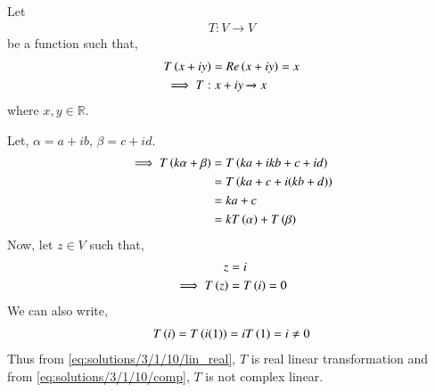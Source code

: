 Let
\begin{align}
    T : V \xrightarrow{} V
\end{align}
be a function such that, 
\begin{align}
    &T\left(x+iy\right) = Re\left(x+iy\right) = x  \\
    &\implies T : x+iy \xrightarrow{} x
\end{align}
 where $ x,y \in \mathbb{R}$.
 
Let, $ \alpha = a+ib$, $\beta = c+id$. 
\begin{align}
    \implies T\left(k\alpha+\beta\right) &= T\left(ka+ikb+c+id\right) \\
    &= T\left(ka+c + i(kb+d)\right) \\
    &= ka+c \\
    &= kT\left(\alpha\right) + T\left(\beta\right) \label{eq:solutions/3/1/10/lin_real}
\end{align}
Now, let $z \in V$ such that, 
\begin{align}
    z &= i \\
    \implies T\left(z\right) &= T\left(i\right) = 0 
\end{align}
We can also write,  
\begin{align}
    T\left(i\right) = T\left(i(1)\right) = iT\left(1\right) = i \ne 0 \label{eq:solutions/3/1/10/comp}
\end{align}
Thus from \eqref{eq:solutions/3/1/10/lin_real}, $T$ is real linear transformation and
from \eqref{eq:solutions/3/1/10/comp}, $T$ is not complex linear. 

